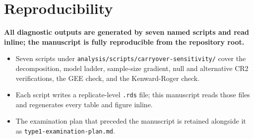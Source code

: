 \documentclass[
  11pt,
]{article}
\begin{document}
\section{Reproducibility}\label{reproducibility}

\textbf{All diagnostic outputs are generated by seven named scripts and read inline; the manuscript is fully reproducible from the repository root.}

\begin{itemize}\setlength{\itemsep}{2pt}\setlength{\parskip}{0pt}
\item Seven scripts under \texttt{analysis/scripts/carryover-sensitivity/} cover the decomposition, model ladder, sample-size gradient, null and alternative CR2 verifications, the GEE check, and the Kenward-Roger check.
\item Each script writes a replicate-level \texttt{.rds} file; this manuscript reads those files and regenerates every table and figure inline.
\item The examination plan that preceded the manuscript is retained alongside it as \texttt{type1-examination-plan.md}.
\end{itemize}
\end{document}
